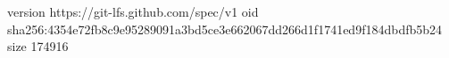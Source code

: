 version https://git-lfs.github.com/spec/v1
oid sha256:4354e72fb8c9e95289091a3bd5ce3e662067dd266d1f1741ed9f184dbdfb5b24
size 174916
